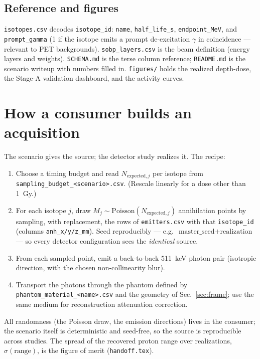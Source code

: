 \documentclass[11pt]{article}
\newcommand{\file}[1]{\texttt{#1}}
\begin{document}
\subsection{Reference and figures}

\file{isotopes.csv} decodes \file{isotope\_id}: \file{name},
\file{half\_life\_s}, \file{endpoint\_MeV}, and \file{prompt\_gamma} (1 if the
isotope emits a prompt de-excitation $\gamma$ in coincidence --- relevant to PET
backgrounds). \file{sobp\_layers.csv} is the beam definition (energy layers and
weights). \file{SCHEMA.md} is the terse column reference; \file{README.md} is the
scenario writeup with numbers filled in. \file{figures/} holds the realized
depth-dose, the Stage-A validation dashboard, and the activity curves.

\section{How a consumer builds an acquisition}
\label{sec:use}

The scenario gives the source; the detector study realizes it. The recipe:
\begin{enumerate}[leftmargin=1.8em]
  \item Choose a timing budget and read $N_{\mathrm{expected},j}$ per isotope
    from \file{sampling\_budget\_<scenario>.csv}. (Rescale linearly for a dose
    other than \SI{1}{Gy}.)
  \item For each isotope $j$, draw $M_j\sim\mathrm{Poisson}(N_{\mathrm{expected},j})$
    annihilation points by sampling, with replacement, the rows of
    \file{emitters.csv} with that \file{isotope\_id} (columns
    \file{anh\_x/y/z\_mm}). Seed reproducibly --- e.g.\
    $\text{master\_seed}+\text{realization}$ --- so every detector configuration
    sees the \emph{identical} source.
  \item From each sampled point, emit a back-to-back \SI{511}{keV} photon pair
    (isotropic direction, with the chosen non-collinearity blur).
  \item Transport the photons through the phantom defined by
    \file{phantom\_material\_<name>.csv} and the geometry of Sec.~\ref{sec:frame};
    use the same medium for reconstruction attenuation correction.
\end{enumerate}
All randomness (the Poisson draw, the emission directions) lives in the consumer;
the scenario itself is deterministic and seed-free, so the source is reproducible
across studies. The spread of the recovered proton range over realizations,
$\sigma(\text{range})$, is the figure of merit (\file{handoff.tex}).
\end{document}
